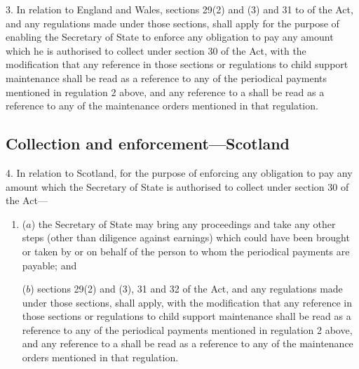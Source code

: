\documentclass[12pt,a4paper]{article}
\begin{document}
3.  In relation to England and Wales, sections 29(2) and (3) and 31 to 
of the Act, and any regulations made under those sections, shall apply for the purpose of enabling the Secretary of State to enforce any obligation to pay any amount which he is authorised to collect under section 30 of the Act, with the modification that any reference in those sections or regulations to child support maintenance shall be read as a reference to any of the periodical payments mentioned in regulation 2 above, and any reference to a 
shall be read as a reference to any of the maintenance orders mentioned in that regulation.


\subsection[4. Collection and enforcement—Scotland]{Collection and enforcement—Scotland}

4.  In relation to Scotland, for the purpose of enforcing any obligation to pay any amount which the Secretary of State is authorised to collect under section 30 of the Act—
\begin{enumerate}\item[]
($a$) the Secretary of State may bring any proceedings and take any other steps (other than diligence against earnings) which could have been brought or taken by or on behalf of the person to whom the periodical payments are payable; and

($b$) sections 29(2) and (3), 31 and 32 of the Act, and any regulations made under those sections, shall apply, with the modification that any reference in those sections or regulations to child support maintenance shall be read as a reference to any of the periodical payments mentioned in regulation 2 above, and any reference to a 
shall be read as a reference to any of the maintenance orders mentioned in that regulation.
\end{enumerate}
\end{document}
